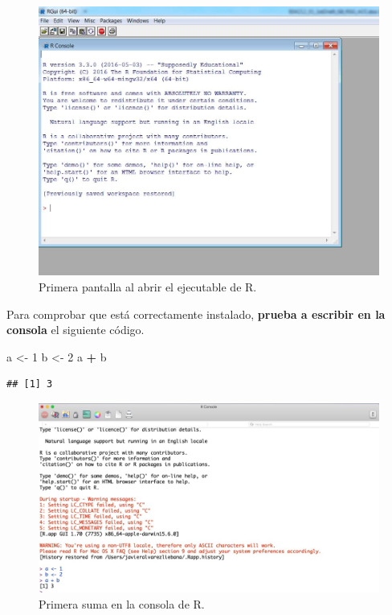 \documentclass[11pt,]{book}
\newenvironment{Shaded}{\begin{snugshade}}{\end{snugshade}}
\newcommand{\DecValTok}[1]{\textcolor[rgb]{0.06,0.06,0.06}{#1}}
\newcommand{\NormalTok}[1]{#1}
\newcommand{\OperatorTok}[1]{\textcolor[rgb]{0.43,0.43,0.43}{\textbf{#1}}}
\newcommand{\StringTok}[1]{\textcolor[rgb]{0.5,0.5,0.5}{#1}}
\begin{document}
\begin{figure}

{\centering \includegraphics[width=0.75\linewidth]{./img/cranR} 

}

\caption{Primera pantalla al abrir el ejecutable de R.}\label{fig:cranR}
\end{figure}

Para comprobar que está correctamente instalado, \textbf{prueba a escribir en la consola} el siguiente código.

\begin{Shaded}
\begin{Highlighting}[]
\NormalTok{a <-}\StringTok{ }\DecValTok{1}
\NormalTok{b <-}\StringTok{ }\DecValTok{2}
\NormalTok{a }\OperatorTok{+}\StringTok{ }\NormalTok{b}
\end{Highlighting}
\end{Shaded}

\begin{verbatim}
## [1] 3
\end{verbatim}

\begin{figure}

{\centering \includegraphics[width=0.75\linewidth]{./img/primera_suma} 

}

\caption{Primera suma en la consola de R.}\label{fig:primera-suma}
\end{figure}
\end{document}
